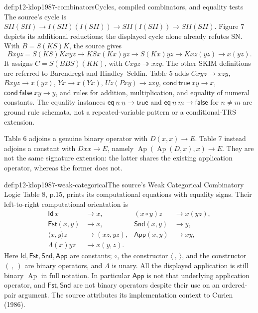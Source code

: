\begin{hbexample}{def:p12-klop1987-combinators}{Cycles, compiled combinators, and equality tests}
The source's cycle is
\(SII(SII)\to I(SII)(I(SII))\to SII(I(SII))\to SII(SII)\).
Figure 7 depicts its additional reductions; the displayed cycle alone
already refutes SN. With \(B=S(KS)K\), the source gives
\[
 Bxyz=S(KS)Kxyz\to KSx(Kx)yz\to S(Kx)yz
 \to Kxz(yz)\to x(yz).
\]
It assigns \(C=S(BBS)(KK)\), with \(Cxyz\twoheadrightarrow xzy\).
The other SKIM definitions are referred to Barendregt and Hindley--Seldin.
Table 5 adds \(Cxyz\to xzy\), \(Bxyz\to x(yz)\),
\(Yx\to x(Yx)\), \(Uz(Pxy)\to zxy\),
\(\mathsf{cond}\ \mathsf{true}\ xy\to x\),
\(\mathsf{cond}\ \mathsf{false}\ xy\to y\), and rules for addition,
multiplication, and equality of numeral constants. The equality instances
\(\mathsf{eq}\ \underline n\ \underline n\to\mathsf{true}\) and
\(\mathsf{eq}\ \underline n\ \underline m\to\mathsf{false}\)
for \(n\ne m\) are ground rule schemata, not a repeated-variable
pattern or a conditional-TRS extension.

Table 6 adjoins a genuine binary operator with \(D(x,x)\to E\).
Table 7 instead adjoins a constant with \(Dxx\to E\), namely
\(\operatorname{Ap}(\operatorname{Ap}(D,x),x)\to E\).
They are not the same signature extension: the latter shares the existing
application operator, whereas the former does not.
\end{hbexample}

\begin{hbdefinition}{def:p12-klop1987-weak-categorical}{The source's Weak Categorical Combinatory Logic}
Table 8, p.15, prints its computational equations with equality signs.
Their left-to-right computational orientation is
\begin{align*}
 \mathsf{Id}\,x&\to x,&(x\circ y)z&\to x(yz),\\
 \mathsf{Fst}(x,y)&\to x,&\mathsf{Snd}(x,y)&\to y,\\
 \langle x,y\rangle z&\to(xz,yz),&\mathsf{App}(x,y)&\to xy,\\
 \Lambda(x)yz&\to x(y,z).
\end{align*}
Here \(\mathsf{Id},\mathsf{Fst},\mathsf{Snd},\mathsf{App}\)
are constants; \(\circ\), the constructor \(\langle\ ,\ \rangle\),
and the constructor \((\ ,\ )\) are binary operators, and
\(\Lambda\) is unary. All the displayed application is still binary
\(\operatorname{Ap}\) in full notation. In particular
\(\mathsf{App}\) is not that underlying application operator, and
\(\mathsf{Fst},\mathsf{Snd}\) are not binary operators despite
their use on an ordered-pair argument. The source attributes its
implementation context to Curien (1986).
\end{hbdefinition}

